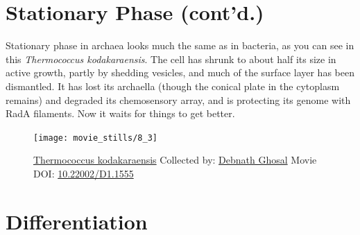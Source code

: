 \documentclass[]{tufte-book}
\begin{document}
\section{Stationary Phase (cont'd.)}\label{stationary-phase-contd.}

Stationary phase in archaea looks much the same as in bacteria, as you
can see in this \emph{Thermococcus kodakaraensis}. The cell has shrunk
to about half its size in active growth, partly by shedding vesicles,
and much of the surface layer has been dismantled. It has lost its
archaella (though the conical plate in the cytoplasm remains) and
degraded its chemosensory array, and is protecting its genome with RadA
filaments. Now it waits for things to get better.





\begin{figure}
\texttt{[image: movie\_stills/8\_3]} \caption[\protect\hyperlink{tree}{Thermococcus kodakaraensis} Collected
by: \protect\hyperlink{debnath_ghosal}{Debnath Ghosal} Movie DOI:
\href{https://doi.org/10.22002/D1.1555}{10.22002/D1.1555}]{\protect\hyperlink{tree}{Thermococcus kodakaraensis} Collected
by: \protect\hyperlink{debnath_ghosal}{Debnath Ghosal} Movie DOI:
\href{https://doi.org/10.22002/D1.1555}{10.22002/D1.1555}}\label{fig:8-3}
\end{figure}

\section{Differentiation}\label{differentiation}
\end{document}
